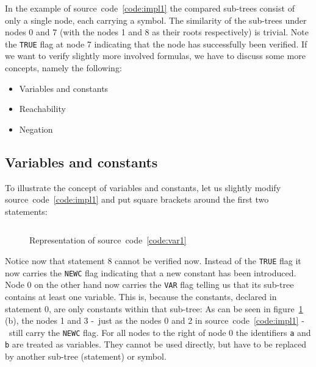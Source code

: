 \documentclass[british]{article}
\newenvironment{code}{\captionsetup{type=listing}}{}
\newcommand\prv{bc}
\newcommand\m[1]{\texttt{#1}}
\begin{document}
In the example of source~code~\ref{code:impl1} the compared sub-trees consist of
only a single node, each carrying a symbol. The similarity of the sub-trees
under nodes 0 and 7 (with the nodes 1 and 8 as their roots respectively) is
trivial. Note the \texttt{TRUE} flag at node 7 indicating that the node has
successfully been verified. If we want to verify slightly more involved
formulas, we have to discuss some more concepts, namely the following:

\begin{itemize}
	\item 
		Variables and constants
	\item 
		Reachability
	\item 
		Negation
\end{itemize}

\pagebreak{}

\subsection{Variables and constants}\label{sec:var}

To illustrate the concept of variables and constants, let us slightly modify
source~code~\ref{code:impl1} and put square brackets around the first two
statements:

\begin{code}
\label{code:var1}
\inputminted[linenos]{\prv}{examples/var1.prove}
\end{code}

\begin{figure}[!h]
\caption{Representation of source~code~\ref{code:var1}}\label{fig:var1}
\centering
{}
\end{figure}

Notice now that statement 8 cannot be verified now. Instead of the \texttt{TRUE}
flag it now carries the \texttt{NEWC} flag indicating that a new constant has
been introduced. Node 0 on the other hand now carries the \texttt{VAR} flag
telling us that its sub-tree contains at least one variable.
This is, because the constants, declared in statement 0, are only constants
within that sub-tree: 
As can be seen in figure~\ref{fig:var1} (b), the nodes 1 and 3 -\ just as the
nodes 0 and 2 in source~code~\ref{code:impl1} -\ still carry the \texttt{NEWC}
flag.
For all nodes to the right of node 0 the identifiers \m{a} and \m{b} are treated
as variables. They cannot be used directly, but have to be replaced by another
sub-tree (statement) or symbol.
\end{document}

